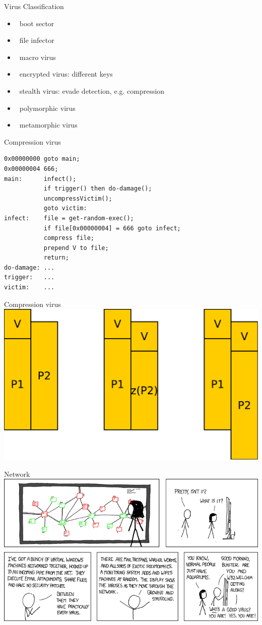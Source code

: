\documentclass{beamer}
\begin{document}
\begin{frame}{Virus Classification}
  \begin{itemize}
  \item  boot sector 
  \item  file infector 
  \item  macro virus 
  \item  encrypted virus: different keys 
  \item  stealth virus: evade detection, e.g. 
    compression 
  \item  polymorphic virus 
  \item  metamorphic virus
  \end{itemize}
\end{frame}

\begin{frame}[fragile]{Compression virus}
  \begin{verbatim}
0x00000000 goto main;
0x00000004 666;
main:      infect();
           if trigger() then do-damage();
           uncompressVictim();
           goto victim:
infect:    file = get-random-exec();
           if file[0x00000004] = 666 goto infect;
           compress file;
           prepend V to file;
           return;
do-damage: ...
trigger:   ...
victim:    ...
  \end{verbatim}
\end{frame}

\begin{frame}{Compression virus}
\includegraphics[width=0.8\linewidth]{compressingVirus}
\end{frame}

\begin{frame}{Network}
\includegraphics[width=0.8\linewidth]{network}
\end{frame}
\end{document}
